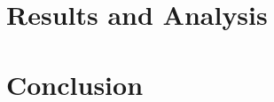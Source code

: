 \documentclass[%
  reprint,
  bibnotes,
  amsmath,amssymb,
  aps,
  pra,
  onecolumn
]{revtex4-2}
\begin{document}
\FloatBarrier
\section{Results and Analysis}


\FloatBarrier
\section{Conclusion}



\newpage



\nocite{*}

\end{document}
